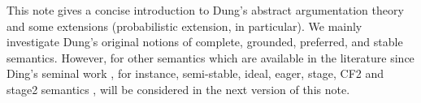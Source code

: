 This note gives a concise introduction to Dung's abstract argumentation theory \cite{Dun1995} and  some extensions (probabilistic extension, in particular).
% 
We mainly investigate Dung's original notions of complete, grounded, preferred, and stable semantics. 
However, 
for other semantics which are available in the literature since Ding's seminal work \cite{Dun1995}, 
for instance, 
semi-stable, ideal, eager, stage, CF2 and stage2 semantics \cite{Bar.Gia2009, Bar.Cam.Gia2018}, 
will be considered in the next version of this note.






\tableofcontents